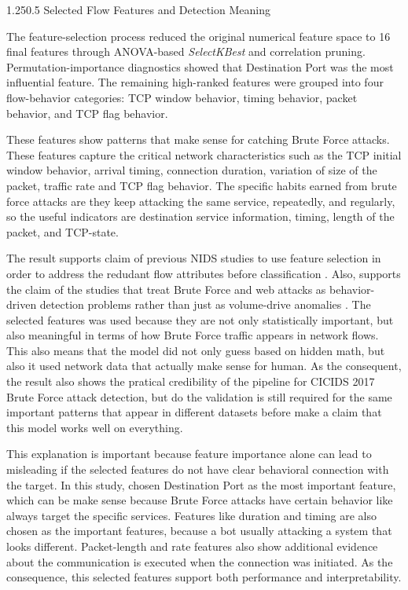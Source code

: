 \documentclass[12pt,a4paper]{article}
\makeatletter
\renewcommand{\subsection}{\@startsection{subsection}{2}{0pt}%
  {1.25\baselineskip}{0.5\baselineskip}%
  {\normalfont\fontsize{13}{15.6}\selectfont\bfseries}}
\makeatother
\begin{document}
\subsection{Selected Flow Features and Detection Meaning}

The feature-selection process reduced the original numerical feature space to 16 final features through ANOVA-based \textit{SelectKBest} and correlation pruning. Permutation-importance diagnostics showed that Destination Port was the most influential feature. The remaining high-ranked features were grouped into four flow-behavior categories: TCP window behavior, timing behavior, packet behavior, and TCP flag behavior.

These features show patterns that make sense for catching Brute Force attacks. These features capture the critical network characteristics such as the TCP initial window behavior, arrival timing, connection duration, variation of size of the packet, traffic rate and TCP flag behavior. The specific habits earned from brute force attacks are they keep attacking the same service, repeatedly, and regularly, so the useful indicators are destination service information, timing, length of the packet, and TCP-state.

The result supports claim of previous NIDS studies to use feature selection in order to address the redudant flow attributes before classification \parencite{nassreddine2025ensemble,alsaffar2024shielding}. Also, supports the claim of the studies that treat Brute Force and web attacks as behavior-driven detection problems rather than just as volume-drive anomalies \parencite{rihan2023iot,irfaissurur2025web}. The selected features was used because they are not only statistically important, but also meaningful in terms of how Brute Force traffic appears in network flows. This also means that the model did not only guess based on hidden math, but also it used network data that actually make sense for human. As the consequent, the result also shows the pratical credibility of the pipeline for CICIDS 2017 Brute Force attack detection, but do the validation is still required for the same important patterns that appear in different datasets before make a claim that this model works well on everything.

This explanation is important because feature importance alone can lead to misleading if the selected features do not have clear behavioral connection with the target. In this study, chosen Destination Port as the most important feature, which can be make sense because Brute Force attacks have certain behavior like always target the specific services. Features like duration and timing are also chosen as the important features, because a bot usually attacking a system that looks different. Packet-length and rate features also show additional evidence about the communication is executed when the connection was initiated. As the consequence, this selected features support both performance and interpretability. 
\end{document}
